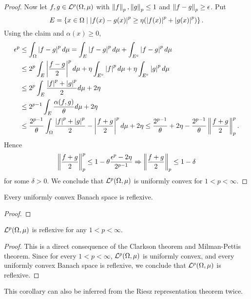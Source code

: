 \begin{proof}
    Now let $f,g\in\mathcal{L}^p(\Omega,\mu)$ with $\left\lVert {f} \right\rVert_p,\left\lVert {g} \right\rVert_p\leq 1$ 
    and $\left\lVert {f-g} \right\rVert_p\geq \epsilon$. Put 
    \begin{equation*}
        E = \left\{ x\in\Omega \;\middle\vert\; \left\lvert {f(x)-g(x)} \right\rvert^p \geq \eta(\left\lvert {f(x)} \right\rvert^p + \left\lvert {g(x)} \right\rvert^p) \right\}.
    \end{equation*}
    Using the claim and $\alpha(x)\geq 0$,
    \begin{equation*}
        \begin{split}
            \epsilon^p &\leq \int_\Omega \left\lvert {f-g} \right\rvert^pd\mu 
            = \int_E \left\lvert {f-g} \right\rvert^pd\mu + \int_{E^c} \left\lvert {f-g} \right\rvert^pd\mu \\ 
            &\leq 2^p\int_E \left\lvert {\frac{f-g}{2}} \right\rvert^pd\mu + \eta\int_{E^c} \left\lvert {f} \right\rvert^pd\mu + \eta\int_{E^c} \left\lvert {g} \right\rvert^pd\mu \\
            &\leq 2^p\int_E \frac{\left\lvert {f} \right\rvert^p+\left\lvert {g} \right\rvert^p}{2}d\mu + 2\eta \\
            &\leq 2^{p-1}\int_E \frac{\alpha(f,g)}{\theta}d\mu + 2\eta \\
            &\leq \frac{2^{p-1}}{\theta}\int_\Omega \frac{\left\lvert {f} \right\rvert^p + \left\lvert {g} \right\rvert^p}{2} - \left\lvert {\frac{f+g}{2}} \right\rvert^pd\mu + 2\eta 
            \leq \frac{2^{p-1}}{\theta} + 2\eta - \frac{2^{p-1}}{\theta}\left\lVert {\frac{f+g}{2}} \right\rVert_p^p.
        \end{split}
    \end{equation*}
    Hence 
    \begin{equation*}
        \left\lVert {\frac{f+g}{2}} \right\rVert_p^p \leq 1 - \theta\frac{\epsilon^p-2\eta}{2^{p-1}} 
        \Rightarrow \left\lVert {\frac{f+g}{2}} \right\rVert_p \leq 1 - \delta
    \end{equation*}
    for some $\delta>0$. We conclude that $\mathcal{L}^p(\Omega,\mu)$ is uniformly convex 
    for $1<p<\infty$.
\end{proof}

\begin{theorem}
    Every uniformly convex Banach space is reflexive.
\end{theorem}
\begin{proof}
    
\end{proof}

\begin{corollary}
    $\mathcal{L}^p(\Omega,\mu)$ is reflexive for any $1< p <\infty$.
\end{corollary}
\begin{proof}
    This is a direct consequence of the Clarkson theorem and 
    Milman-Pettis theorem. Since for every $1<p<\infty$, 
    $\mathcal{L}^p(\Omega,\mu)$ is uniformly convex, and every uniformly 
    convex Banach space is reflexive, we conclude that 
    $\mathcal{L}^p(\Omega,\mu)$ is reflexive.
\end{proof}
\begin{remark}
    This corollary can also be inferred from the Riesz 
    representation theorem twice. 
\end{remark}

